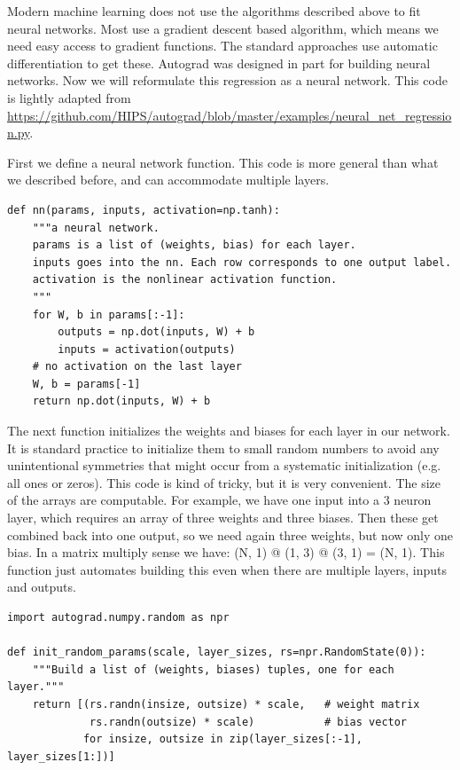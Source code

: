 \documentclass[11pt]{article}
\begin{document}
Modern machine learning does not use the algorithms described above to fit neural networks. Most use a gradient descent based algorithm, which means we need easy access to gradient functions. The standard approaches use automatic differentiation to get these. Autograd was designed in part for building neural networks. Now we will  reformulate this regression as a neural network. This code is lightly adapted from \url{https://github.com/HIPS/autograd/blob/master/examples/neural\_net\_regression.py}.

First we define a neural network function. This code is more general than what we described before, and can accommodate multiple layers.

\begin{verbatim}
def nn(params, inputs, activation=np.tanh):
    """a neural network.
    params is a list of (weights, bias) for each layer.
    inputs goes into the nn. Each row corresponds to one output label.
    activation is the nonlinear activation function.
    """
    for W, b in params[:-1]:
        outputs = np.dot(inputs, W) + b
        inputs = activation(outputs)
    # no activation on the last layer
    W, b = params[-1]
    return np.dot(inputs, W) + b
\end{verbatim}

The next function initializes the weights and biases for each layer in our network. It is standard practice to initialize them to small random numbers to avoid any unintentional symmetries that might occur from a systematic initialization (e.g. all ones or zeros). This code is kind of tricky, but it is very convenient. The size of the arrays are computable. For example, we have one input into a 3 neuron layer, which requires an array of three weights and three biases. Then these get combined back into one output, so we need  again three weights, but now only one bias. In a matrix multiply sense we have: (N, 1) @ (1, 3) @ (3, 1) = (N, 1). This function just automates building this even when there are multiple layers, inputs and outputs.

\begin{verbatim}
import autograd.numpy.random as npr

def init_random_params(scale, layer_sizes, rs=npr.RandomState(0)):
    """Build a list of (weights, biases) tuples, one for each layer."""
    return [(rs.randn(insize, outsize) * scale,   # weight matrix
             rs.randn(outsize) * scale)           # bias vector
            for insize, outsize in zip(layer_sizes[:-1], layer_sizes[1:])]
\end{verbatim}
\end{document}
